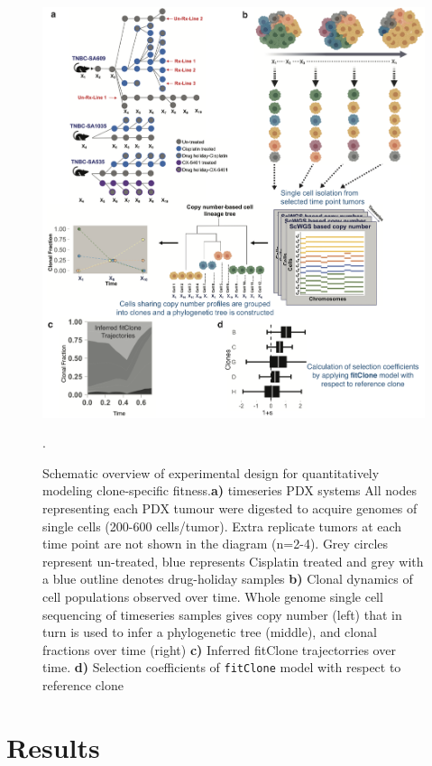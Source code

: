 \begin{figure}
\centering
\includegraphics[width=\textwidth]{Figures/chap4/fig1thesischap4.png}
\caption{Schematic overview of experimental design for quantitatively modeling clone-specific fitness.\textbf{a)} timeseries PDX systems All nodes representing each PDX tumour were digested to acquire genomes of single cells (200-600 cells/tumor). Extra replicate tumors at each time point are not shown in the diagram (n=2-4). Grey circles represent un-treated, blue represents Cisplatin treated and grey with a blue outline denotes drug-holiday samples \textbf{b)} Clonal dynamics of cell populations observed over time. Whole genome single cell sequencing of timeseries samples gives copy number (left) that in turn is used to infer a phylogenetic tree (middle), and clonal fractions over time (right) \textbf{c)} Inferred fitClone trajectorries over time. \textbf{d)} Selection coefficients of \texttt{fitClone} model with respect to reference clone}.
\label{fig:schematic}
\end{figure}



\section{Results}

